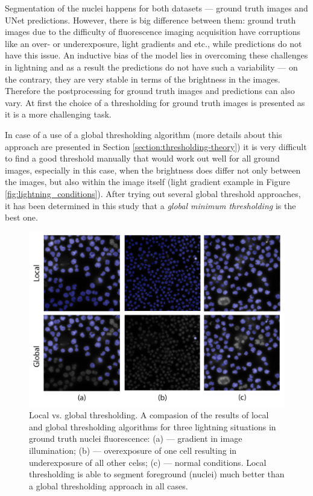 Segmentation of the nuclei happens for both datasets --- ground truth images and UNet predictions. However, there is big difference between them: ground truth images due to the difficulty of fluorescence imaging acquisition have corruptions like an over- or underexposure, light gradients and etc., while predictions do not have this issue. An inductive bias of the model lies in overcoming these challenges in lightning and as a result the predictions do not have such a variability --- on the contrary, they are very stable in terms of the brightness in the images. Therefore the postprocessing for ground truth images and predictions can also vary. At first the choice of a thresholding for ground truth images is presented as it is a more challenging task.

In case of a use of a global thresholding algorithm (more details about this approach are presented in Section \ref{section:thresholding-theory}) it is very difficult to find a good threshold manually that would work out well for all ground images, especially in this case, when the brightness does differ not only between the images, but also within the image itself (light gradient example in Figure \ref{fig:lightning_conditions}). After trying out several global threshold approaches, it has been determined in this study that a \textit{global minimum thresholding} is the best one.

\begin{figure}[htb]
	\begin{center}
		\includegraphics[width=0.6\linewidth]{bilder/difficult-lightning/local-vs-global.png}
		\caption[Local vs. global thresholding]%
        {Local vs. global thresholding. A compasion of the results of local and global thresholding algorithms for three lightning situations in ground truth nuclei fluorescence: (a) --- gradient in image illumination; (b) --- overexposure of one cell resulting in underexposure of all other celss; (c) --- normal conditions. Local thresholding is able to segment foreground (nuclei) much better than a global thresholding approach in all cases.}\label{fig:thresholding-bad-conditions}
	\end{center}
\end{figure}

